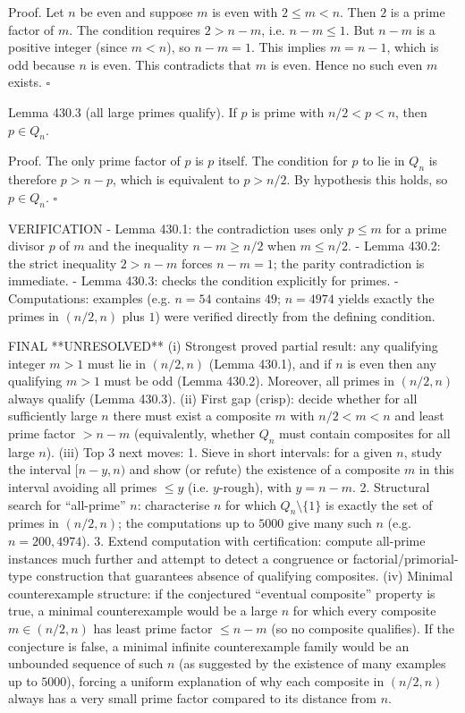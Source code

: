 Proof.
Let $n$ be even and suppose $m$ is even with $2\le m<n$.
Then $2$ is a prime factor of $m$. The condition requires $2>n-m$, i.e. $n-m\le 1$.
But $n-m$ is a positive integer (since $m<n$), so $n-m=1$.
This implies $m=n-1$, which is odd because $n$ is even. This contradicts that $m$ is even.
Hence no such even $m$ exists.
\hfill $\square$

Lemma 430.3 (all large primes qualify).
If $p$ is prime with $n/2<p<n$, then $p\in Q_n$.

Proof.
The only prime factor of $p$ is $p$ itself. The condition for $p$ to lie in $Q_n$ is therefore $p>n-p$, which is equivalent to $p>n/2$.
By hypothesis this holds, so $p\in Q_n$.
\hfill $\square$

VERIFICATION
- Lemma 430.1: the contradiction uses only $p\le m$ for a prime divisor $p$ of $m$ and the inequality $n-m\ge n/2$ when $m\le n/2$.
- Lemma 430.2: the strict inequality $2>n-m$ forces $n-m=1$; the parity contradiction is immediate.
- Lemma 430.3: checks the condition explicitly for primes.
- Computations: examples (e.g. $n=54$ contains $49$; $n=4974$ yields exactly the primes in $(n/2,n)$ plus $1$) were verified directly from the defining condition.

FINAL
**UNRESOLVED**
(i) Strongest proved partial result: any qualifying integer $m>1$ must lie in $(n/2,n)$ (Lemma 430.1), and if $n$ is even then any qualifying $m>1$ must be odd (Lemma 430.2). Moreover, all primes in $(n/2,n)$ always qualify (Lemma 430.3).
(ii) First gap (crisp): decide whether for all sufficiently large $n$ there must exist a composite $m$ with $n/2<m<n$ and least prime factor $>n-m$ (equivalently, whether $Q_n$ must contain composites for all large $n$).
(iii) Top 3 next moves:
  1. Sieve in short intervals: for a given $n$, study the interval $[n-y,n)$ and show (or refute) the existence of a composite $m$ in this interval avoiding all primes $\le y$ (i.e. $y$-rough), with $y=n-m$.
  2. Structural search for “all-prime” $n$: characterise $n$ for which $Q_n\setminus\{1\}$ is exactly the set of primes in $(n/2,n)$; the computations up to $5000$ give many such $n$ (e.g. $n=200,4974$).
  3. Extend computation with certification: compute all-prime instances much further and attempt to detect a congruence or factorial/primorial-type construction that guarantees absence of qualifying composites.
(iv) Minimal counterexample structure: if the conjectured “eventual composite” property is true, a minimal counterexample would be a large $n$ for which every composite $m\in(n/2,n)$ has least prime factor $\le n-m$ (so no composite qualifies). If the conjecture is false, a minimal infinite counterexample family would be an unbounded sequence of such $n$ (as suggested by the existence of many examples up to $5000$), forcing a uniform explanation of why each composite in $(n/2,n)$ always has a very small prime factor compared to its distance from $n$.


